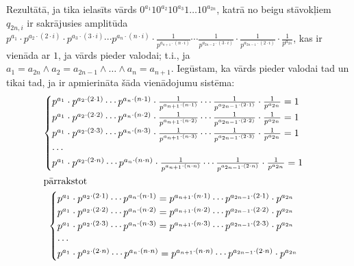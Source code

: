 \documentclass{ludis}
\begin{document}
\begin{pieradijums}
Rezultātā, ja tika ielasīts vārds $0^{a_1}10^{a_2}10^{a_3}1\ldots 10^{a_{2n}}$, katrā no beigu stāvokļiem $q_{2n,i}$ ir sakrājusies amplitūda
$p^{a_1}\cdot p^{a_2 \cdot (2\cdot i)}\cdot p^{a_3 \cdot (3\cdot i)}\cdots p^{a_n \cdot (n\cdot i)} \cdot \frac{1}{p^{a_{n+1} \cdot (n\cdot i)}}\cdots \frac{1}{p^{a_{2n-2} \cdot (3\cdot i)}}\cdot \frac{1}{p^{a_{2n-1} \cdot (2\cdot i)}}\cdot \frac{1}{p^{a_{2n}}}$,
kas ir vienāda ar $1$, ja vārds pieder valodai; t.i., ja
$a_1 = a_{2n} \wedge a_2 = a_{2n-1} \wedge \ldots \wedge a_n = a_{n+1}$.
Iegūstam, ka vārds pieder valodai tad un tikai tad, ja ir apmierināta šāda vienādojumu sistēma:
\begin{gather*}
	\begin{cases}
		p^{a_1}\cdot p^{a_2 \cdot (2\cdot 1)} \cdots p^{a_n \cdot (n\cdot 1)} \cdot \frac{1}{p^{a_{n+1} \cdot (n\cdot 1)}}\cdots \frac{1}{p^{a_{2n-1} \cdot (2\cdot 1)}}\cdot \frac{1}{p^{a_{2n}}} = 1\\
		p^{a_1}\cdot p^{a_2 \cdot (2\cdot 2)}\cdots p^{a_n \cdot (n\cdot 2)} \cdot \frac{1}{p^{a_{n+1} \cdot (n\cdot 2)}}\cdots \frac{1}{p^{a_{2n-1} \cdot (2\cdot 2)}}\cdot \frac{1}{p^{a_{2n}}} = 1\\
		p^{a_1}\cdot p^{a_2 \cdot (2\cdot 3)}\cdots p^{a_n \cdot (n\cdot 3)} \cdot \frac{1}{p^{a_{n+1} \cdot (n\cdot 3)}}\cdots \frac{1}{p^{a_{2n-1} \cdot (2\cdot 3)}}\cdot \frac{1}{p^{a_{2n}}} = 1\\
		\cdots \\
		p^{a_1}\cdot p^{a_2 \cdot (2\cdot n)}\cdots p^{a_n \cdot (n\cdot n)} \cdot \frac{1}{p^{a_{n+1} \cdot (n\cdot n)}}\cdots \frac{1}{p^{a_{2n-1} \cdot (2\cdot n)}}\cdot \frac{1}{p^{a_{2n}}} = 1\\
	\end{cases}\\
\intertext{pārrakstot}
	\begin{cases}
		p^{a_1}\cdot p^{a_2 \cdot (2\cdot 1)} \cdots p^{a_n \cdot (n\cdot 1)} = p^{a_{n+1} \cdot (n\cdot 1)}\cdots p^{a_{2n-1} \cdot (2\cdot 1)}\cdot p^{a_{2n}}\\
		p^{a_1}\cdot p^{a_2 \cdot (2\cdot 2)} \cdots p^{a_n \cdot (n\cdot 2)} = p^{a_{n+1} \cdot (n\cdot 2)}\cdots p^{a_{2n-1} \cdot (2\cdot 2)}\cdot p^{a_{2n}}\\
		p^{a_1}\cdot p^{a_2 \cdot (2\cdot 3)} \cdots p^{a_n \cdot (n\cdot 3)} = p^{a_{n+1} \cdot (n\cdot 3)}\cdots p^{a_{2n-1} \cdot (2\cdot 3)}\cdot p^{a_{2n}}\\
		\cdots \\
		p^{a_1}\cdot p^{a_2 \cdot (2\cdot n)} \cdots p^{a_n \cdot (n\cdot n)} = p^{a_{n+1} \cdot (n\cdot n)}\cdots p^{a_{2n-1} \cdot (2\cdot n)}\cdot p^{a_{2n}}\\

\end{cases}
\end{gather*}
\end{pieradijums}
\end{document}
